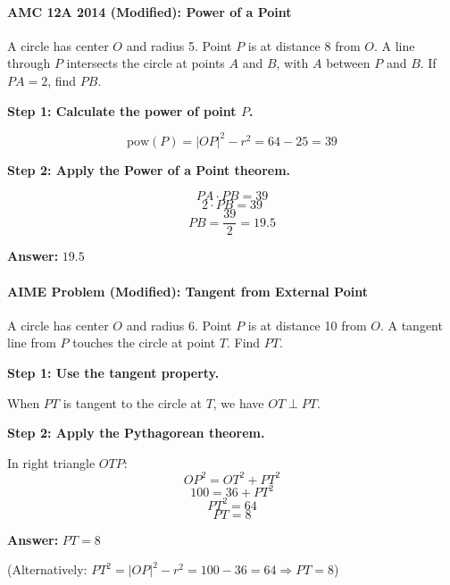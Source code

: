 ﻿\documentclass[12pt]{extarticle}
\begin{document}
\begin{theorembox}
\begin{center}
\end{center}
\end{theorembox}

\paragraph{AMC 12A 2014 (Modified): Power of a Point}

A circle has center $O$ and radius 5. Point $P$ is at distance 8 from $O$. A line through $P$ intersects the circle at points $A$ and $B$, with $A$ between $P$ and $B$. If $PA = 2$, find $PB$.

\begin{solutionbox}
\textbf{Step 1: Calculate the power of point $P$.}

\[\text{pow}(P) = |OP|^2 - r^2 = 64 - 25 = 39\]

\textbf{Step 2: Apply the Power of a Point theorem.}

\[PA \cdot PB = 39\]
\[2 \cdot PB = 39\]
\[PB = \frac{39}{2} = 19.5\]

\textbf{Answer:} $\boxed{19.5}$
\end{solutionbox}

\paragraph{AIME Problem (Modified): Tangent from External Point}

A circle has center $O$ and radius 6. Point $P$ is at distance 10 from $O$. A tangent line from $P$ touches the circle at point $T$. Find $PT$.

\begin{solutionbox}
\textbf{Step 1: Use the tangent property.}

When $PT$ is tangent to the circle at $T$, we have $OT \perp PT$.

\textbf{Step 2: Apply the Pythagorean theorem.}

In right triangle $OTP$:
\[OP^2 = OT^2 + PT^2\]
\[100 = 36 + PT^2\]
\[PT^2 = 64\]
\[PT = 8\]

\textbf{Answer:} $\boxed{PT = 8}$

(Alternatively: $PT^2 = |OP|^2 - r^2 = 100 - 36 = 64 \Rightarrow PT = 8$)
\end{solutionbox}
\end{document}
